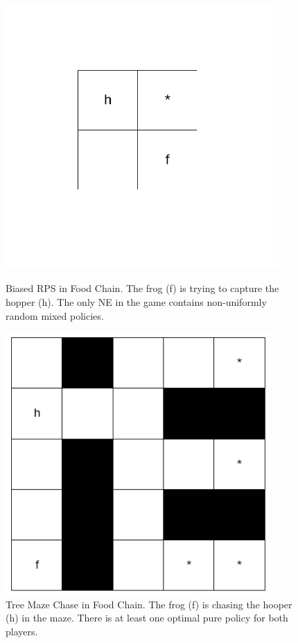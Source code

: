 \documentclass[]{interact}
\theoremstyle{plain}%
\theoremstyle{definition}
\theoremstyle{remark}
\begin{document}
\begin{figure}
\centering
    \begin{minipage}{0.48\textwidth}
        \centering
        \includegraphics[width=0.93\textwidth]{images/biased_rps.png}
        \caption{Biased RPS in Food Chain. The frog (f) is trying to capture the hopper (h). The only NE in the game contains non-uniformly random mixed policies.}
        \label{fig:biased_rps_in_food_chain}
    \end{minipage}\hfill
    \begin{minipage}{0.48\textwidth}
        \centering
        \includegraphics[width=0.9\textwidth]{images/tree_maze_chase.png}
        \caption{Tree Maze Chase in Food Chain. The frog (f) is chasing the hooper (h) in the maze. There is at least one optimal pure policy for both players.}
        \label{fig:tree_maze_chase}
    \end{minipage}
\end{figure}
\end{document}
